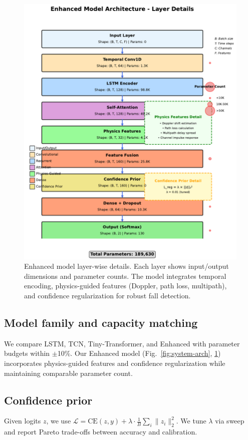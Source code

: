 \documentclass[10pt,conference]{IEEEtran}
\newcommand{\model}{Enhanced}
\begin{document}
\begin{figure}[t]
  \centering
  \includegraphics[width=\linewidth]{figures/fig3_model_details.pdf}
  \caption{Enhanced model layer-wise details. Each layer shows input/output dimensions and parameter counts. The model integrates temporal encoding, physics-guided features (Doppler, path loss, multipath), and confidence regularization for robust fall detection.}
  \label{fig:model-details}
\end{figure}

\subsection{Model family and capacity matching}
We compare LSTM, TCN, Tiny-Transformer, and \model{} with parameter budgets within $\pm$10\%. Our Enhanced model (Fig.~\ref{fig:system-arch}, \ref{fig:model-details}) incorporates physics-guided features and confidence regularization while maintaining comparable parameter count.
\subsection{Confidence prior}
Given logits $z$, we use $\mathcal{L}=\mathrm{CE}(z,y)+\lambda \cdot \frac{1}{B}\sum_i \|z_i\|_2^2$. We tune $\lambda$ via sweep and report Pareto trade-offs between accuracy and calibration.
\end{document}
